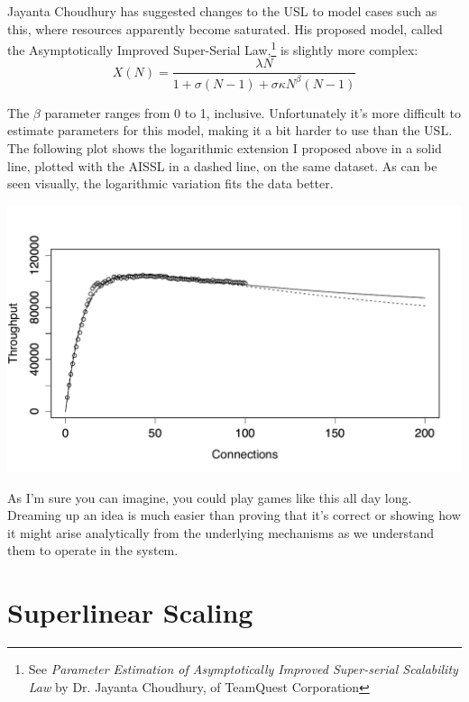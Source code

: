 \documentclass{vivid_layout}
\begin{document}
Jayanta Choudhury has suggested changes to the USL to model cases such as this,
where resources apparently become saturated.  His proposed model, called the
Asymptotically Improved Super-Serial Law,\footnote{See {\itshape Parameter
Estimation of Asymptotically Improved Super-serial Scalability Law} by Dr.
Jayanta Choudhury, of TeamQuest Corporation} is slightly more complex:
\[
X(N) = \frac{\lambda N}{1 + \sigma(N-1) + \sigma \kappa N^\beta (N-1)}
\]

The $\beta$ parameter ranges from 0 to 1, inclusive. Unfortunately it's
more difficult to estimate parameters for this model, making it a bit harder to
use than the USL. The following plot shows the logarithmic extension I proposed
above in a solid line, plotted with the AISSL in a dashed line, on the same
dataset. As can be seen visually, the logarithmic variation fits the data
better.
\begin{center}
\includegraphics[width=.85\linewidth]{scalability/aissl}
\end{center}

As I'm sure you can imagine, you could play games like this all day long.
Dreaming up an idea is much easier than proving that it's correct or showing
how it might arise analytically from the underlying mechanisms as we understand
them to operate in the system.

\section{Superlinear Scaling}
\end{document}
